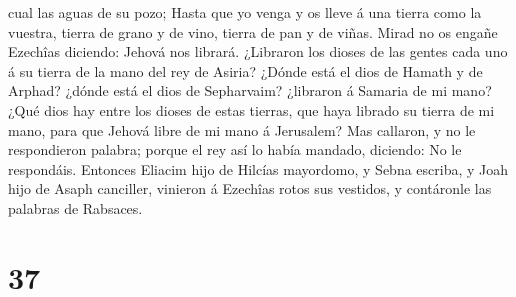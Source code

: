 cual las aguas de su pozo;  Hasta que yo venga y os lleve á
una tierra como la vuestra, tierra de grano y de vino, tierra de pan y
de viñas.  Mirad no os engañe Ezechîas diciendo: Jehová nos
librará. ¿Libraron los dioses de las gentes cada uno á su tierra de la
mano del rey de Asiria?  ¿Dónde está el dios de Hamath y de
Arphad? ¿dónde está el dios de Sepharvaim? ¿libraron á Samaria de mi
mano?  ¿Qué dios hay entre los dioses de estas tierras, que
haya librado su tierra de mi mano, para que Jehová libre de mi mano á
Jerusalem?  Mas callaron, y no le respondieron palabra;
porque el rey así lo había mandado, diciendo: No le respondáis.
 Entonces Eliacim hijo de Hilcías mayordomo, y Sebna
escriba, y Joah hijo de Asaph canciller, vinieron á Ezechîas rotos sus
vestidos, y contáronle las palabras de Rabsaces.

\hypertarget{section-36}{%
\section{37}\label{section-36}}

